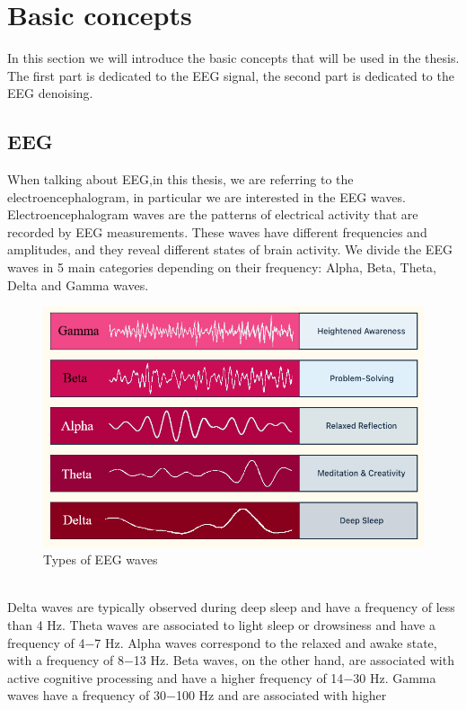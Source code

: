 \documentclass[a4paper, noexaminfo]{sapthesis}
\begin{document}
\section{Basic concepts}
In this section we will introduce the basic concepts that will be used 
in the thesis. The first part is dedicated to the EEG signal, the second
part is dedicated to the EEG denoising.
\subsection{EEG}
When talking about EEG,in this thesis, we are referring to the
electroencephalogram, in particular we are interested in the 
EEG waves. Electroencephalogram waves are the patterns 
of electrical activity that are recorded by EEG measurements. 
These waves have different frequencies and amplitudes, and they 
reveal different states of brain activity. We divide the EEG waves in 
5 main categories depending on their frequency: Alpha, Beta, Theta, 
Delta and Gamma waves.\cite{waves type}
\begin{figure}[h]
  \includegraphics[scale=0.6]{waves}
  \centering
  \caption{Types of EEG waves}\label{fig:waves}
  \end{figure}\newline \\
Delta waves are typically observed during deep sleep and have a frequency
of less than 4 Hz. Theta waves are associated to light sleep or 
drowsiness and have a frequency of 4$-$7 Hz. Alpha waves correspond to the 
relaxed and awake state, with a frequency of 8$-$13 Hz. Beta waves, on the other 
hand, are associated with active cognitive processing and have a higher 
frequency of 14$-$30 Hz. Gamma waves have a frequency of 30$-$100 Hz and are associated with higher 
\end{document}
